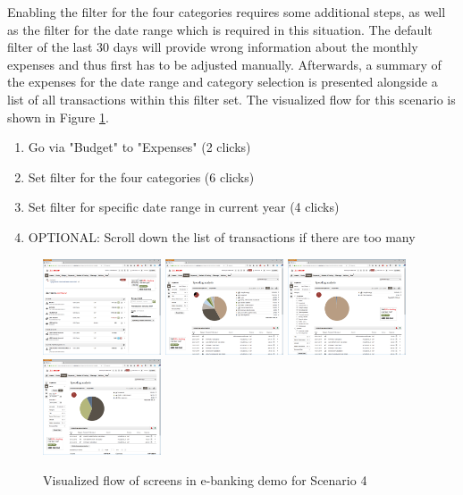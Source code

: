 Enabling the filter for the four categories requires some additional steps, as well as the filter for the date range which is required in this situation. The default filter of the last 30 days will provide wrong information about the monthly expenses and thus first has to be adjusted manually. Afterwards, a summary of the expenses for the date range and category selection is presented alongside a list of all transactions within this filter set. The visualized flow for this scenario is shown in Figure \ref{fig:scenariofourebanking}.
\begin{enumerate}
	\item Go via "Budget" to "Expenses" (2 clicks)
	\item Set filter for the four categories (6 clicks)
	\item Set filter for specific date range in current year (4 clicks)
	\item OPTIONAL: Scroll down the list of transactions if there are too many
\end{enumerate}
\begin{figure}[h]
	\begin{center}
		\includegraphics[width=3.5cm]{03_Figures/09_Evaluation/UBS_1_Overview.png}
		\includegraphics[width=3.5cm]{03_Figures/09_Evaluation/UBS_2_SpendingAnalysis.png}
		\includegraphics[width=3.5cm]{03_Figures/09_Evaluation/UBS_2_SpendingAnalysis_FilterCat.png}
		\includegraphics[width=3.5cm]{03_Figures/09_Evaluation/UBS_2_SpendingAnalysis_Filter.png}
		\caption{Visualized flow of screens in e-banking demo for Scenario 4}
		\label{fig:scenariofourebanking}
	\end{center}
\end{figure}


